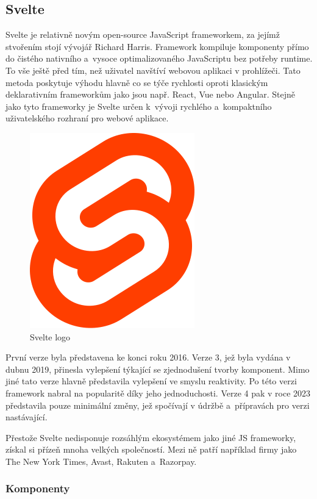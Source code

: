 \subsection{Svelte}

Svelte je relativně novým open-source JavaScript frameworkem, za jejímž stvořením stojí vývojář Richard Harris. 
Framework kompiluje komponenty přímo do čistého nativního a~vysoce optimalizovaného JavaScriptu bez potřeby runtime. 
To vše ještě před tím, než uživatel navštíví webovou aplikaci v prohlížeči. 
Tato metoda poskytuje výhodu hlavně co se týče rychlosti oproti klasickým deklarativním frameworkům jako jsou např. React, Vue nebo Angular. 
Stejně jako tyto frameworky je Svelte určen k~vývoji rychlého a~kompaktního uživatelského rozhraní pro webové aplikace.

\begin{figure}[htb]
	\centering
		\includegraphics[width=.3\textwidth]{images/svelte-logo.png}
	\caption[Svelte logo]{Svelte logo \cite{svelte}}
	\label{fig:sveltelogo}
\end{figure}

První verze byla představena ke konci roku 2016. Verze 3, jež byla vydána v dubnu 2019, přinesla vylepšení týkající se zjednodušení tvorby komponent. 
Mimo jiné tato verze hlavně představila vylepšení ve smyslu reaktivity. Po této verzi framework nabral na popularitě díky jeho jednoduchosti.
Verze 4 pak v roce 2023 představila pouze minimální změny, jež spočívají v údržbě a~přípravách pro verzi nastávající.

Přestože Svelte nedisponuje rozsáhlým ekosystémem jako jiné JS frameworky, získal si přízeň mnoha velkých společností. 
Mezi ně patří například firmy jako The New York Times, Avast, Rakuten a~Razorpay.\cite{sveltemdn,svelte,sveltedevinterface}

\subsubsection{Komponenty}

